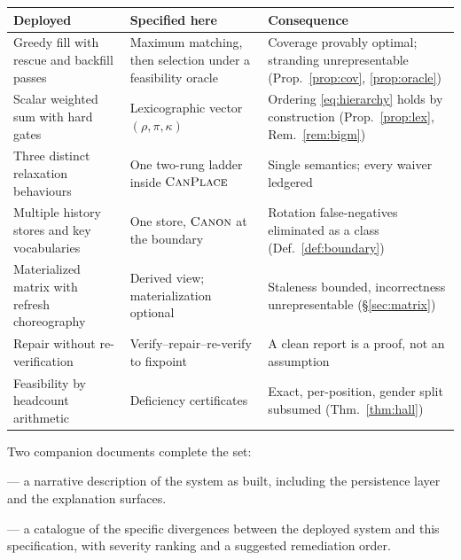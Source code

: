 \documentclass[11pt,a4paper]{article}
\theoremstyle{definition}
\theoremstyle{remark}
\newcommand{\canplace}{\textsc{CanPlace}}
\newcommand{\canon}{\textsc{Canon}}
\begin{document}
\begin{center}
\begin{tabular}{@{}L{0.29\textwidth}L{0.30\textwidth}L{0.30\textwidth}@{}}
\toprule
\textbf{Deployed} & \textbf{Specified here} & \textbf{Consequence} \\
\midrule
Greedy fill with rescue and backfill passes &
Maximum matching, then selection under a feasibility oracle &
Coverage provably optimal; stranding unrepresentable
(Prop.~\ref{prop:cov}, \ref{prop:oracle}) \\[0.3em]
Scalar weighted sum with hard gates &
Lexicographic vector $(\rho, \pi, \kappa)$ &
Ordering \eqref{eq:hierarchy} holds by construction
(Prop.~\ref{prop:lex}, Rem.~\ref{rem:bigm}) \\[0.3em]
Three distinct relaxation behaviours &
One two-rung ladder inside $\canplace$ &
Single semantics; every waiver ledgered \\[0.3em]
Multiple history stores and key vocabularies &
One store, $\canon$ at the boundary &
Rotation false-negatives eliminated as a class
(Def.~\ref{def:boundary}) \\[0.3em]
Materialized matrix with refresh choreography &
Derived view; materialization optional &
Staleness bounded, incorrectness unrepresentable
(\S\ref{sec:matrix}) \\[0.3em]
Repair without re-verification &
Verify--repair--re-verify to fixpoint &
A clean report is a proof, not an assumption \\[0.3em]
Feasibility by headcount arithmetic &
Deficiency certificates &
Exact, per-position, gender split subsumed
(Thm.~\ref{thm:hall}) \\
\bottomrule
\end{tabular}
\end{center}

\vspace{1em}
\noindent
Two companion documents complete the set:

\begin{description}[itemsep=0.2em,topsep=0.3em,leftmargin=1.2em]
  \item[\normalfont\texttt{PLACEMENT\_ARCHITECTURE.md}] --- a narrative
        description of the system as built, including the persistence layer
        and the explanation surfaces.
  \item[\normalfont\texttt{PLACEMENT\_REVIEW\_2026-07-18.md}] --- a
        catalogue of the specific divergences between the deployed system
        and this specification, with severity ranking and a suggested
        remediation order.
\end{description}
\end{document}

